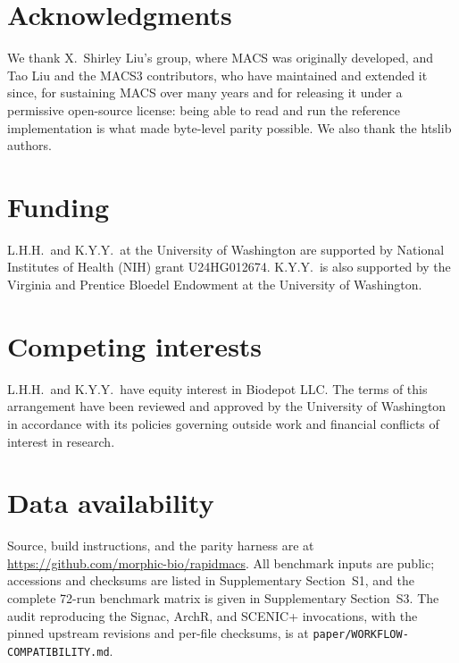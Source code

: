 \documentclass[namedate,webpdf,contemporary,large]{oup-authoring-template}
\begin{document}
\section{Acknowledgments}
We thank X.~Shirley Liu's group, where MACS was originally developed, and Tao Liu and the MACS3 contributors, who have maintained and extended it since, for sustaining MACS over many years and for releasing it under a permissive open-source license: being able to read and run the reference implementation is what made byte-level parity possible. We also thank the htslib authors.

\section{Funding}
L.H.H.\ and K.Y.Y.\ at the University of Washington are supported by National Institutes of Health (NIH) grant U24HG012674. K.Y.Y.\ is also supported by the Virginia and Prentice Bloedel Endowment at the University of Washington.

\section{Competing interests}
L.H.H.\ and K.Y.Y.\ have equity interest in Biodepot LLC. The terms of this arrangement have been reviewed and approved by the University of Washington in accordance with its policies governing outside work and financial conflicts of interest in research.

\section{Data availability}
Source, build instructions, and the parity harness are at \url{https://github.com/morphic-bio/rapidmacs}. All benchmark inputs are public; accessions and checksums are listed in Supplementary Section~S1, and the complete 72-run benchmark matrix is given in Supplementary Section~S3. The audit reproducing the Signac, ArchR, and SCENIC+ invocations, with the pinned upstream revisions and per-file checksums, is at \texttt{paper/\allowbreak WORKFLOW-\allowbreak COMPATIBILITY.md}.

\setlength{\bibsep}{0pt plus 0.3ex}


\end{document}
